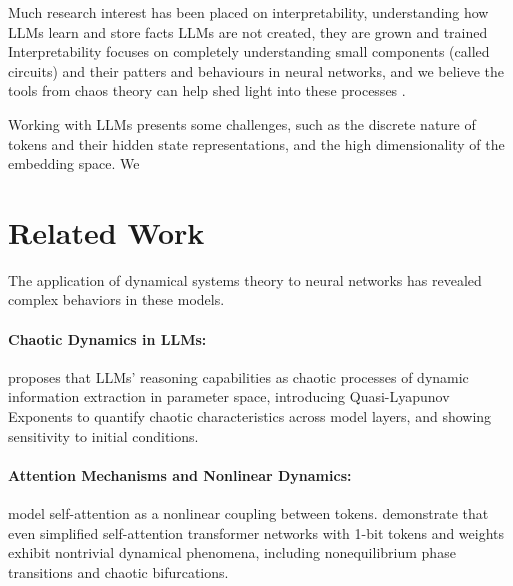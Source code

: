 \documentclass[a4paper,12pt]{article}
\begin{document}
Much research interest has been placed on interpretability, understanding how LLMs learn and store facts
LLMs are not created, they are grown and trained
Interpretability focuses on completely understanding small components (called circuits) and their patters and behaviours in neural networks, and we believe the tools from chaos theory can help shed light into these processes \cite{olah2020zoom} \cite{ameisen2025circuit} \cite{lindsey2025biology}.

Working with LLMs presents some challenges, such as the discrete nature of tokens and their hidden state representations, and the high dimensionality of the embedding space. We 

\section{Related Work} 
\label{sec:related_work}

The application of dynamical systems theory to neural networks has revealed complex behaviors in these models.  

\paragraph{Chaotic Dynamics in LLMs:}

\cite{li2025cognitive_activation} proposes that LLMs' reasoning capabilities as chaotic processes of dynamic information extraction in parameter space, introducing Quasi-Lyapunov Exponents to quantify chaotic characteristics across model layers, and showing sensitivity to initial conditions.

\paragraph{Attention Mechanisms and Nonlinear Dynamics:}
\cite{geshkovski2025mathematicalperspectivetransformers} model self-attention as a nonlinear coupling between tokens.
\cite{dynamicalmeanfieldtheoryselfattention} demonstrate that even simplified self-attention transformer networks with 1-bit tokens and weights exhibit nontrivial dynamical phenomena, including nonequilibrium phase transitions and chaotic bifurcations. 
\end{document}
